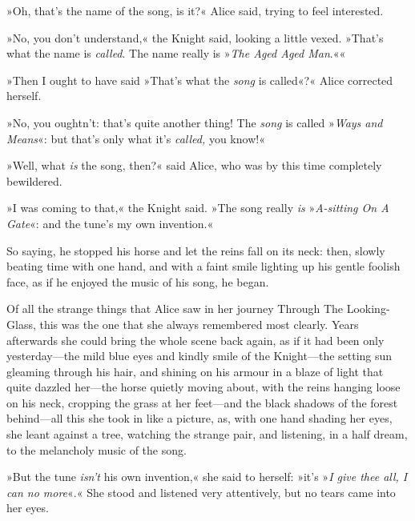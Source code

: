 »Oh, that's the name of the song, is it?« Alice said, trying to feel interested.

»No, you don't understand,« the Knight said, looking a little vexed. »That's what the name is \textit{called}. The name really is »\textit{The Aged Aged Man}.««

»Then I ought to have said »That's what the \textit{song} is called«?« Alice corrected herself.

»No, you oughtn't: that's quite another thing! The \textit{song} is called »\textit{Ways and Means}«: but that's only what it's \textit{called,} you know!«

»Well, what \textit{is} the song, then?« said Alice, who was by this time completely bewildered.

»I was coming to that,« the Knight said. »The song really \textit{is} »\textit{A-sitting On A Gate}«: and the tune's my own invention.«

So saying, he stopped his horse and let the reins fall on its neck: then, slowly beating time with one hand, and with a faint smile lighting up his gentle foolish face, as if he enjoyed the music of his song, he began.

Of all the strange things that Alice saw in her journey Through The Looking-Glass, this was the one that she always remembered most clearly. Years afterwards she could bring the whole scene back again, as if it had been only yesterday—the mild blue eyes and kindly smile of the Knight—the setting sun gleaming through his hair, and shining on his armour in a blaze of light that quite dazzled her—the horse quietly moving about, with the reins hanging loose on his neck, cropping the grass at her feet—and the black shadows of the forest behind—all this she took in like a picture, as, with one hand shading her eyes, she leant against a tree, watching the strange pair, and listening, in a half dream, to the melancholy music of the song.

»But the tune \textit{isn't} his own invention,« she said to herself: »it's »\textit{I give thee all, I can no more}«.« She stood and listened very attentively, but no tears came into her eyes.

